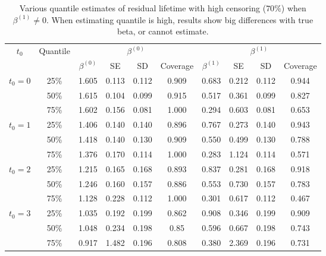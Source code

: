 \documentclass[12pt]{article}
\begin{document}
	\begin{table}[H]
		\caption{Various quantile estimates of residual lifetime with high censoring ($70\%$) when $\beta^{(1)} \neq 0$. When estimating quantile is high, results show big differences with true beta, or cannot estimate.}
		\centering
		\begin{tabular}{|c|c|c|c|c|c|c|c|c|c|}
			\hline
			\multirow{2}{*}{$t_0$} & \multirow{2}{*}{Quantile} & \multicolumn{4}{c|}{$\beta^{(0)}$} & \multicolumn{4}{c|}{$\beta^{(1)}$}\\ \cline{3-10}
			& & $\beta^{(0)}$ & SE & SD  & Coverage  & $\beta^{(1)}$ & SE & SD & Coverage\\
			\hline\hline
			\multirow{3}{*}{$t_0=0$} & 25\% & 1.605 & 0.113 & 0.112 & 0.909 & 0.683 & 0.212 & 0.112 & 0.944 \\ 
			& 50\% & 1.615 & 0.104 & 0.099 & 0.915 & 0.517 & 0.361 & 0.099 & 0.827 \\  
			& 75\% & 1.602 & 0.156 & 0.081 & 1.000 & 0.294 & 0.603 & 0.081 & 0.653 \\
			\hline
			\multirow{3}{*}{$t_0=1$} & 25\% & 1.406 & 0.140 & 0.140 & 0.896 & 0.767 & 0.273 & 0.140 & 0.943 \\
			& 50\% & 1.418 & 0.140 & 0.130 & 0.909 & 0.550 & 0.499 & 0.130 & 0.788 \\
			& 75\% & 1.376 & 0.170 & 0.114 & 1.000 & 0.283 & 1.124 & 0.114 & 0.571 \\ 
			\hline
			\multirow{3}{*}{$t_0=2$} & 25\% & 1.215 & 0.165 & 0.168 & 0.893 & 0.837 & 0.281 & 0.168 & 0.918 \\
			& 50\% & 1.246 & 0.160 & 0.157 & 0.886 & 0.553 & 0.730 & 0.157 & 0.783 \\ 
			& 75\% & 1.128 & 0.228 & 0.112 & 1.000 & 0.301 & 0.617 & 0.112 & 0.467 \\ 
			\hline
			\multirow{3}{*}{$t_0=3$} & 25\% & 1.035 & 0.192 & 0.199 & 0.862 & 0.908 & 0.346 & 0.199 & 0.909 \\
			& 50\% & 1.048 & 0.234 & 0.198 & 0.85 & 0.596 & 0.667 & 0.198 & 0.743 \\
			& 75\% & 0.917 & 1.482 & 0.196 & 0.808 & 0.380 & 2.369 & 0.196 & 0.731 \\ 
			\hline
		\end{tabular}
	\end{table}
\end{document}
